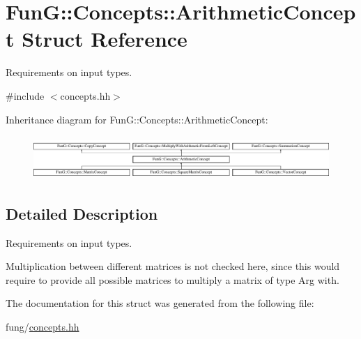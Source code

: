 \hypertarget{structFunG_1_1Concepts_1_1ArithmeticConcept}{\section{\-Fun\-G\-:\-:\-Concepts\-:\-:\-Arithmetic\-Concept \-Struct \-Reference}
\label{structFunG_1_1Concepts_1_1ArithmeticConcept}
}


\-Requirements on input types.  




{\ttfamily \#include $<$concepts.\-hh$>$}

\-Inheritance diagram for \-Fun\-G\-:\-:\-Concepts\-:\-:\-Arithmetic\-Concept\-:\begin{figure}[H]
\begin{center}
\leavevmode
\includegraphics[height=1.661721cm]{structFunG_1_1Concepts_1_1ArithmeticConcept}
\end{center}
\end{figure}


\subsection{\-Detailed \-Description}
\-Requirements on input types. 

\-Multiplication between different matrices is not checked here, since this would require to provide all possible matrices to multiply a matrix of type \-Arg with. 

\-The documentation for this struct was generated from the following file\-:\begin{DoxyCompactItemize}
\item 
fung/\hyperlink{concepts_8hh}{concepts.\-hh}\end{DoxyCompactItemize}
